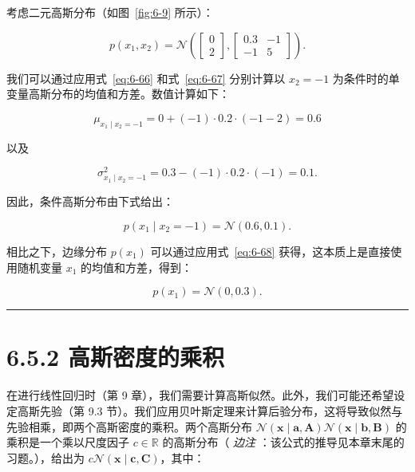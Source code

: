 \begin{notebox}
考虑二元高斯分布（如图~\ref{fig:6-9} 所示）：

\begin{equation}
p(x_1, x_2) = \mathcal{N}\left( \begin{bmatrix} 0 \\ 2 \end{bmatrix}, \begin{bmatrix} 0.3 & -1 \\ -1 & 5 \end{bmatrix} \right) .
\tag{6.69}\label{eq:6-69}
\end{equation}

我们可以通过应用式~\eqref{eq:6-66} 和式~\eqref{eq:6-67} 分别计算以 $ x_2 = -1 $ 为条件时的单变量高斯分布的均值和方差。数值计算如下：

\begin{equation}
\mu_{x_1 \mid x_2 = -1} = 0 + (-1) \cdot 0.2 \cdot (-1 - 2) = 0.6
\tag{6.70}\label{eq:6-70}
\end{equation}

以及

\begin{equation}
\sigma_{x_1 \mid x_2 = -1}^2 = 0.3 - (-1) \cdot 0.2 \cdot (-1) = 0.1 .
\tag{6.71}\label{eq:6-71}
\end{equation}

因此，条件高斯分布由下式给出：

\begin{equation}
p(x_1 \mid x_2 = -1) = \mathcal{N}(0.6, 0.1) .
\tag{6.72}\label{eq:6-72}
\end{equation}

相比之下，边缘分布 $ p(x_1) $ 可以通过应用式~\eqref{eq:6-68} 获得，这本质上是直接使用随机变量 $ x_1 $ 的均值和方差，得到：

\begin{equation}
p(x_1) = \mathcal{N}(0, 0.3) .
\tag{6.73}\label{eq:6-73}
\end{equation}
\end{notebox}

\medskip\hrule\medskip

\section*{6.5.2 高斯密度的乘积}

在进行线性回归时（第 9 章），我们需要计算高斯似然。此外，我们可能还希望设定高斯先验（第 9.3 节）。我们应用贝叶斯定理来计算后验分布，这将导致似然与先验相乘，即两个高斯密度的乘积。两个高斯分布 $ \mathcal{N}(\boldsymbol{x} \mid \boldsymbol{a}, \boldsymbol{A})\mathcal{N}(\boldsymbol{x} \mid \boldsymbol{b}, \boldsymbol{B}) $ 的乘积是一个乘以尺度因子 $ c \in \mathbb{R} $ 的高斯分布（ \emph{边注} ：该公式的推导见本章末尾的习题。），给出为 $ c \mathcal{N}(\boldsymbol{x} \mid \boldsymbol{c}, \boldsymbol{C}) $，其中：

